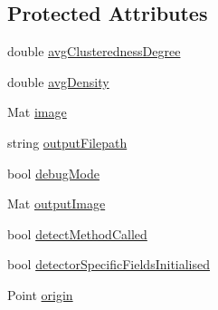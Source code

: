 \subsection*{Protected Attributes}
\begin{DoxyCompactItemize}
\item 
double \hyperlink{classmultiscale_1_1analysis_1_1Detector_a6d06607ae468a56e48f8daba0a00df5b}{avg\-Clusteredness\-Degree}
\item 
double \hyperlink{classmultiscale_1_1analysis_1_1Detector_a411629d4cf34809127662d625ba057c0}{avg\-Density}
\item 
Mat \hyperlink{classmultiscale_1_1analysis_1_1Detector_a523830a6cfe409694ce8327c3c736fbd}{image}
\item 
string \hyperlink{classmultiscale_1_1analysis_1_1Detector_a1a83df16d8afd347c0e1c9ddc41c9bee}{output\-Filepath}
\item 
bool \hyperlink{classmultiscale_1_1analysis_1_1Detector_a4b42f796957efd6ee0b8cf7645494a65}{debug\-Mode}
\item 
Mat \hyperlink{classmultiscale_1_1analysis_1_1Detector_a144e080a3af03c9bf3d8a80315823c86}{output\-Image}
\item 
bool \hyperlink{classmultiscale_1_1analysis_1_1Detector_ad565f471d9d7db7692da588ff0d6be2f}{detect\-Method\-Called}
\item 
bool \hyperlink{classmultiscale_1_1analysis_1_1Detector_a172b91067670a14a7707f24dc218f2af}{detector\-Specific\-Fields\-Initialised}
\item 
Point \hyperlink{classmultiscale_1_1analysis_1_1Detector_a002237e2ad684975a7c8b1e12dd7d780}{origin}
\end{DoxyCompactItemize}
